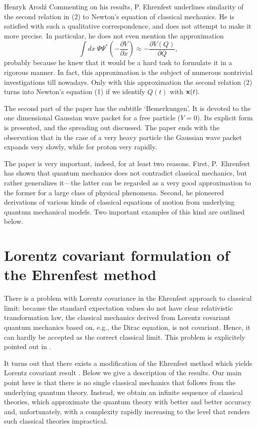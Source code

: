 \begin{artengenv}{Henryk Arod\'z}
Commenting on his results, P. Ehrenfest underlines similarity of the second relation in (2) to Newton's equation of classical mechanics. He is satisfied with such a qualitative correspondence, and does not attempt to make it more precise. In particular, he does not even mention the approximation
\[ \int \! dx \:\Psi \Psi^* (- \frac{\partial V}{\partial x}) \approx - \frac{\partial V(Q)}{\partial Q}, \]
probably because he knew that it would be a hard task to formulate it in a rigorous manner. In fact, this approximation is the subject of numerous nontrivial investigations till nowadays. Only with this approximation the second relation (2) turns into Newton's equation (1) 
if we identify $ Q(t)$ with ${\bf x}(t).$ 


The second part of the paper has the subtitle `Bemerkungen'. It is devoted to the one dimensional Gaussian wave packet for a free particle ($V=0$). Its explicit form is presented, and the spreading out discussed. The paper ends with the observation that in the case of a very heavy particle the Gaussian wave packet expands very slowly, while for proton very rapidly. 

The paper \parencite{ehr} is very important, indeed, for at least two reasons. First, P.~Ehrenfest has shown that quantum mechanics does not contradict classical mechanics, but rather generalizes it---the latter can be regarded as a very good approximation to the former for a large class of physical phenomena. 
Second, he pioneered derivations of various kinds of classical equations of motion from underlying quantum mechanical models. Two important examples of this kind are outlined below. 





\section{Lorentz covariant formulation of the Ehrenfest method}

There is a problem with Lorentz covariance in the Ehrenfest approach to classical limit: because the standard expectation values do not have clear relativistic transformation law, the classical mechanics derived from Lorentz covariant quantum mechanics based on, e.g., the Dirac equation, is not covariant. Hence, it can hardly be accepted as the correct classical limit. This problem is explicitely pointed out in \parencite{HilWou}. 

It turns out that there exists a modification of the Ehrenfest method which yields Lorentz covariant result \parencite{aro1}. Below we give a description of the results. Our main point here is that there is no single classical mechanics that follows from the underlying quantum theory. Instead, we obtain an infinite sequence of classical theories, which approximate the quantum theory with better and better accuracy and, unfortunately, with a complexity rapidly increasing to the level that renders such classical theories impractical. 




\end{artengenv}
